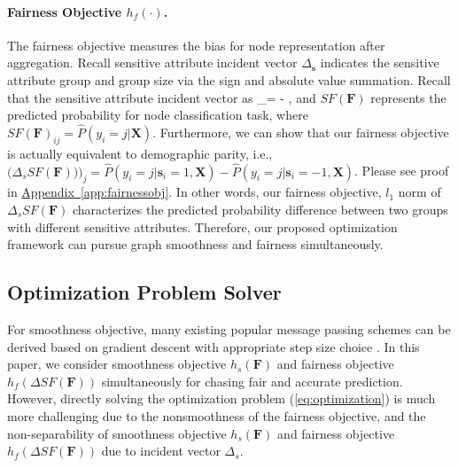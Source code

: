\documentclass[letterpaper]{article} %
\theoremstyle{plain}
\theoremstyle{definition}
\theoremstyle{remark}
\begin{document}
\paragraph{Fairness Objective $h_f(\cdot)$.} The fairness objective measures the bias for node representation after aggregation. Recall sensitive attribute incident vector $\Delta_{\mathbf{s}}$ indicates the sensitive attribute group and group size via the sign and absolute value summation. Recall that the sensitive attribute incident vector as
\be
\Delta_{}=  - ,
\ee
and $SF(\mathbf{F})$ represents the predicted probability for node classification task, where $SF(\mathbf{F})_{ij}=\hat{P}(y_i=j|\mathbf{X})$. Furthermore, we can show that our fairness objective is actually equivalent to demographic parity, i.e., $\Big(\Delta_s SF(\mathbf{F})\big)\Big)_j=\hat{P}(y_i=j|\mathbf{s}_i=1, \mathbf{X}) - \hat{P}(y_i=j|\mathbf{s}_i=-1, \mathbf{X})$. Please see proof in \underline{Appendix~\ref{app:fairnessobj}}.
In other words, our fairness objective, $l_1$ norm of $\Delta_s SF(\mathbf{F})$ characterizes the predicted probability difference between two groups with different sensitive attributes. Therefore, our proposed optimization framework can pursue graph smoothness and fairness simultaneously.

\subsection{Optimization Problem Solver}
For smoothness objective, many existing popular message passing schemes can be derived based on gradient descent with appropriate step size choice \citep{ma2021unified,zhu2021interpreting}. In this paper, we consider smoothness objective $h_s(\mathbf{F})$ and fairness objective $h_f(\Delta SF(\mathbf{F}))$ simultaneously for chasing fair and accurate prediction. However, directly solving the optimization problem (\ref{eq:optimization}) is much more challenging due to the nonsmoothness of the fairness objective, and the non-separability of smoothness objective $h_s(\mathbf{F})$ and fairness objective $h_f(\Delta SF(\mathbf{F}))$ due to incident vector $\Delta_s$.
\end{document}
